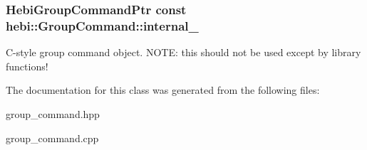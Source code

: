 \subsubsection[{\texorpdfstring{internal\+\_\+}{internal_}}]{\setlength{\rightskip}{0pt plus 5cm}Hebi\+Group\+Command\+Ptr const hebi\+::\+Group\+Command\+::internal\+\_\+}\hypertarget{classhebi_1_1GroupCommand_aa3380b0b6c64b2d03df3d5d69a884a12}{}\label{classhebi_1_1GroupCommand_aa3380b0b6c64b2d03df3d5d69a884a12}
C-\/style group command object. N\+O\+TE\+: this should not be used except by library functions! 

The documentation for this class was generated from the following files\+:\begin{DoxyCompactItemize}
\item 
group\+\_\+command.\+hpp\item 
group\+\_\+command.\+cpp\end{DoxyCompactItemize}
